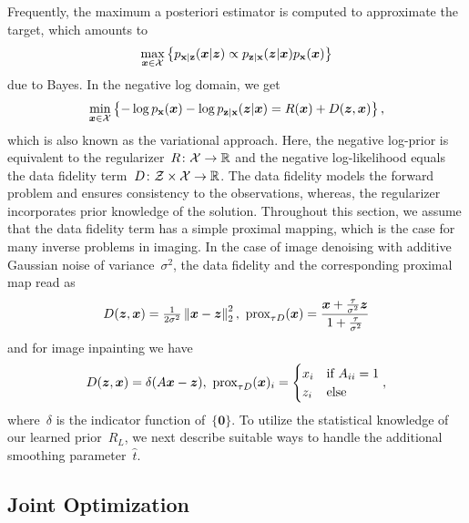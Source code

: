 \documentclass{article}
\newcommand{\X}{\mathcal{X}}
\newcommand{\Z}{\mathcal{Z}}
\newcommand{\norm}[1]{\left\Vert#1\right\Vert}
\renewcommand{\vec}[1]{\mathbf{#1}}
\newcommand{\prox}{\mathrm{prox}}
\def\hatt{{\widehat{t}}}
\newcommand{\pdf}[1]{p_{#1}}
\theoremstyle{plain}
\theoremstyle{definition}
\theoremstyle{remark}
\begin{document}
Frequently, the maximum a posteriori estimator is computed to approximate the target, which amounts to
\[
\max_{\vx\in\X}\left\{\pdf{\rvx\vert\rvz}(\vx\vert\vz)\propto \pdf{\rvz\vert\rvx}(\vz\vert\vx)\pdf{\rvx}(\vx)\right\}
\]
due to Bayes.
In the negative log domain, we get
\[
\min_{\vx\in\X}\left\{ -\log\pdf{\rvx}(\vx) -\log\pdf{\rvz\vert\rvx}(\vz\vert\vx) = R(\vx) + D(\vz,\vx)\right\},
\]
which is also known as the variational approach.
Here, the negative log-prior is equivalent to the regularizer~$R\colon\X\to\R$ and the negative log-likelihood equals the data fidelity term~$D\colon\Z\times\X\to\R$.
The data fidelity models the forward problem and ensures consistency to the observations, whereas, the regularizer incorporates prior knowledge of the solution.
Throughout this section, we assume that the data fidelity term has a simple proximal mapping, which is the case for many inverse problems in imaging.
In the case of image denoising with additive Gaussian noise of variance~$\sigma^2$, the data fidelity and the corresponding proximal map read as
\[
D(\vz,\vx)=\tfrac{1}{2\sigma^2}\norm{\vx-\vz}_2^2,\ \prox_{\tau D}(\vx)= \frac{\vx+\tfrac{\tau}{\sigma^2}\vz}{1+\tfrac{\tau}{\sigma^2}}    
\]
and for image inpainting we have
\[
D(\vz,\vx)=\delta(A\vx-\vz),\ \prox_{\tau D}(\vx)_i=\begin{cases}
x_i &\text{if } A_{ii} = 1\\
z_i &\text{else}
\end{cases},
\]
where~$\delta$ is the indicator function of~$\{\vec{0}\}$. 
To utilize the statistical knowledge of our learned prior~$R_L$, we next describe suitable ways to handle the additional smoothing parameter~$\hatt$.

\subsection{Joint Optimization} \label{sec:jointOptimization}
\end{document}
